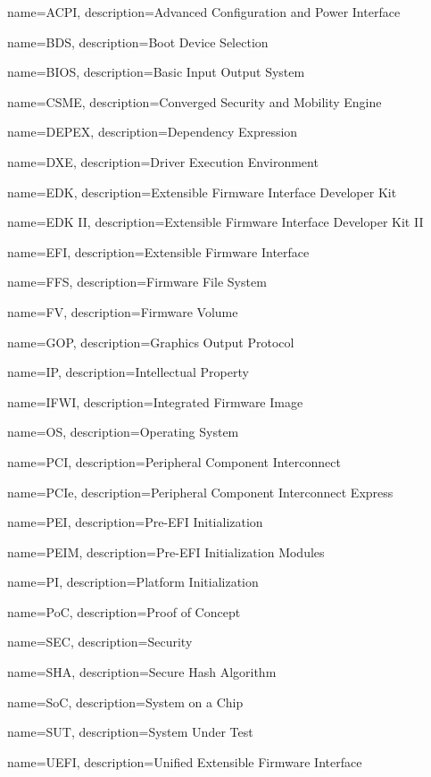  {
	name=ACPI,
	description={Advanced Configuration and Power Interface
	}
}

 {
	name=BDS,
	description={Boot Device Selection
	}
}

 {
    name=BIOS,
    description={Basic Input Output System
    }
}


 {
    name=CSME,
    description={Converged Security and Mobility Engine
    }
}

 {
	name=DEPEX,
	description={Dependency Expression
	}
}


 {
	name=DXE,
	description={Driver Execution Environment
	}
}

 {
	name=EDK,
	description={Extensible Firmware Interface Developer Kit
	}
}

 {
	name=EDK II,
	description={Extensible Firmware Interface Developer Kit II
	}
}

 {
	name=EFI,
	description={Extensible Firmware Interface
	}
}

 {
    name=FFS,
    description={Firmware File System
    }
}

 {
    name=FV,
    description={Firmware Volume
    }
}

 {
    name=GOP,
    description={Graphics Output Protocol
    }
}

 {
    name=IP,
    description={Intellectual Property
    }
}

 {
    name=IFWI,
    description={Integrated Firmware Image
    }
}

 {
	name=OS,
	description={Operating System
	}
}

 {
	name=PCI,
	description={Peripheral Component Interconnect
	}
}

 {
	name=PCIe,
	description={Peripheral Component Interconnect Express
	}
}

 {
    name=PEI,
    description={Pre-EFI Initialization
    }
}

 {
    name=PEIM,
    description={Pre-EFI Initialization Modules
    }
}

 {
	name=PI,
	description={Platform Initialization
	}
}

 {
	name=PoC,
	description={Proof of Concept
	}
}

 {
	name=SEC,
	description={Security
	}
}

 {
	name=SHA,
	description={Secure Hash Algorithm
	}
}

 {
	name=SoC,
	description={System on a Chip
	}
}


 {
	name=SUT,
	description={System Under Test
	}
}

 {
	name=UEFI,
	description={Unified Extensible Firmware Interface
	}
}
